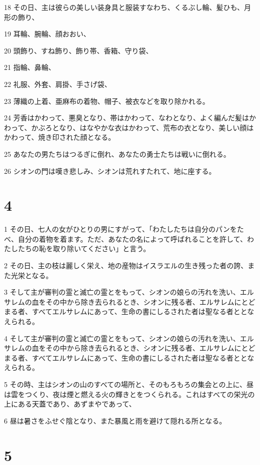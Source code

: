\par 18 その日、主は彼らの美しい装身具と服装すなわち、くるぶし輪、髪ひも、月形の飾り、
\par 19 耳輪、腕輪、顔おおい、
\par 20 頭飾り、すね飾り、飾り帯、香箱、守り袋、
\par 21 指輪、鼻輪、
\par 22 礼服、外套、肩掛、手さげ袋、
\par 23 薄織の上着、亜麻布の着物、帽子、被衣などを取り除かれる。
\par 24 芳香はかわって、悪臭となり、帯はかわって、なわとなり、よく編んだ髪はかわって、かぶろとなり、はなやかな衣はかわって、荒布の衣となり、美しい顔はかわって、焼き印された顔となる。
\par 25 あなたの男たちはつるぎに倒れ、あなたの勇士たちは戦いに倒れる。
\par 26 シオンの門は嘆き悲しみ、シオンは荒れすたれて、地に座する。

\chapter{4}

\par 1 その日、七人の女がひとりの男にすがって、「わたしたちは自分のパンをたべ、自分の着物を着ます。ただ、あなたの名によって呼ばれることを許して、わたしたちの恥を取り除いてください」と言う。
\par 2 その日、主の枝は麗しく栄え、地の産物はイスラエルの生き残った者の誇、また光栄となる。
\par 3 そして主が審判の霊と滅亡の霊とをもって、シオンの娘らの汚れを洗い、エルサレムの血をその中から除き去られるとき、シオンに残る者、エルサレムにとどまる者、すべてエルサレムにあって、生命の書にしるされた者は聖なる者ととなえられる。
\par 4 そして主が審判の霊と滅亡の霊とをもって、シオンの娘らの汚れを洗い、エルサレムの血をその中から除き去られるとき、シオンに残る者、エルサレムにとどまる者、すべてエルサレムにあって、生命の書にしるされた者は聖なる者ととなえられる。
\par 5 その時、主はシオンの山のすべての場所と、そのもろもろの集会との上に、昼は雲をつくり、夜は煙と燃える火の輝きとをつくられる。これはすべての栄光の上にある天蓋であり、あずまやであって、
\par 6 昼は暑さをふせぐ陰となり、また暴風と雨を避けて隠れる所となる。

\chapter{5}

